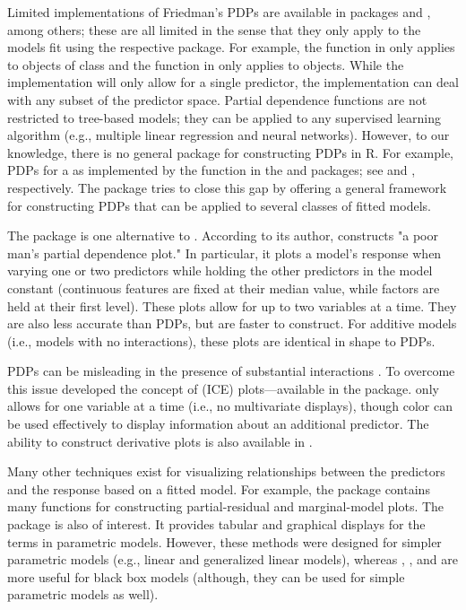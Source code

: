 Limited implementations of Friedman's PDPs are available in packages  \citep{randomForest-pkg} and , among others; these are all limited in the sense that they only apply to the models fit using the respective package. For example, the  function in  only applies to objects of class  and the  function in  only applies to  objects. While the  implementation will only allow for a single predictor, the  implementation can deal with any subset of the predictor space. Partial dependence functions are not restricted to tree-based models; they can be applied to any supervised learning algorithm (e.g., multiple linear regression and neural networks). However, to our knowledge, there is no general package for constructing PDPs  in R. For example, PDPs for a  as implemented by the  function in the  and  packages; see \citet{party-pkg} and \citet{partykit-pkg}, respectively. The  \citep{pdp-pkg} package tries to close this gap by offering a general framework for constructing PDPs that can be applied to several classes of fitted models.

The  package \citep{plotmo-pkg} is one alternative to . According to its author,  constructs "a poor man's partial dependence plot." In particular, it plots a model's response when varying one or two predictors while holding the other predictors in the model constant (continuous features are fixed at their median value, while factors are held at their first level). These plots allow for up to two variables at a time. They are also less accurate than PDPs, but are faster to construct. For additive models (i.e., models with no interactions), these plots are identical in shape to PDPs.

PDPs can be misleading in the presence of substantial interactions \citep{goldstein-peeking-2015}. To overcome this issue \citeauthor*{goldstein-peeking-2015} developed the concept of  (ICE) plots---available in the  package.  only allows for one variable at a time (i.e., no multivariate displays), though color can be used effectively to display information about an additional predictor. The ability to construct derivative plots is also available in .

Many other techniques exist for visualizing relationships between the predictors and the response based on a fitted model. For example, the  package \citep{fox-car-2011} contains many functions for constructing partial-residual and marginal-model plots. The  package \citep{fox-effects-2003} is also of interest. It provides tabular and graphical displays for the terms in parametric models. However, these methods were designed for simpler parametric models (e.g., linear and generalized linear models), whereas , , and  are more useful for black box models (although, they can be used for simple parametric models as well).


